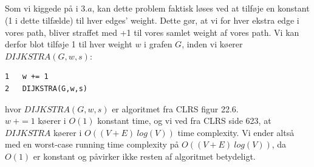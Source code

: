 \documentclass[a4paper,12pt]{article}
\begin{document}
\subsection[]{}
Som vi kiggede på i $3.a$, kan dette problem faktisk løses ved at tilføje en konstant (1 i dette tilfælde) til hver edges' weight. Dette gør, at vi for hver ekstra edge i vores path, bliver straffet med +1 til vores samlet weight af vores path. Vi kan derfor blot tilføje 1 til hver weight $w$ i grafen $G$, inden vi køerer $DIJKSTRA(G,w,s)$:

\begin{lstlisting}
1   w += 1
2   DIJKSTRA(G,w,s)
\end{lstlisting}
hvor $DIJKSTRA(G,w,s)$ er algoritmet fra CLRS figur 22.6.\\

$w\ += 1$ køerer i $O(1)$ konstant time, og vi ved fra CLRS side 623, at $DIJKSTRA$ køerer i $O((V+E)\ log (V))$ time complexity. Vi ender altså med en worst-case running time complexity på $O((V+E)\ log (V))$, da $O(1)$ er konstant og påvirker ikke resten af algoritmet betydeligt.
\end{document}
